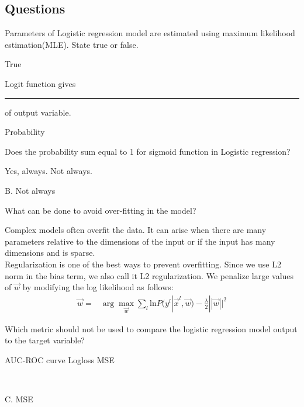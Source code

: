 \documentclass[12pt,letterpaper, onecolumn]{exam}
\begin{document}
\subsection*{Questions}

\begin{questions}
\question[]Parameters of Logistic regression model are estimated using maximum likelihood estimation(MLE). State true or false.\\
\begin{Solution}
True
  \end{Solution}
\question[]Logit function gives \rule{2cm}{0.15mm} of output variable.\\
\begin{Solution}
Probability
  \end{Solution}
\question[] Does the probability sum equal to 1 for sigmoid function in Logistic regression?
\begin{choices}
\choice Yes, always.
\choice Not always.
\end{choices}
\begin{Solution}
B. Not always
  \end{Solution}
\question[] What can be done to avoid over-fitting in the model?\\
\begin{Solution}
\newline
Complex models often overfit the data. It can arise when there are many parameters relative to the dimensions of the input or if the input has many dimensions and is sparse.\\
Regularization is one of the best ways to prevent overfitting. Since we use L2 norm in the bias term, we also call it L2 regularization.
We penalize large values of $\vec{w}$ by modifying the log likelihood as follows:
\begin{align}
\vec{w} = {}& \arg \max_{\vec{w}} \sum_{l} \text{ln} P(y^l|\vec{x}^l,\vec{w}) - \frac{\lambda}{2}||\vec{w}||^2
\end{align}
\end{Solution}
\question[] Which metric should not be used to compare the logistic regression model output to the target variable?\\
\begin{oneparchoices}
\choice AUC-ROC curve
\choice Logloss
\choice MSE
\end{oneparchoices}\\
\begin{Solution}
C. MSE
  \end{Solution}
\end{questions}
\end{document}
